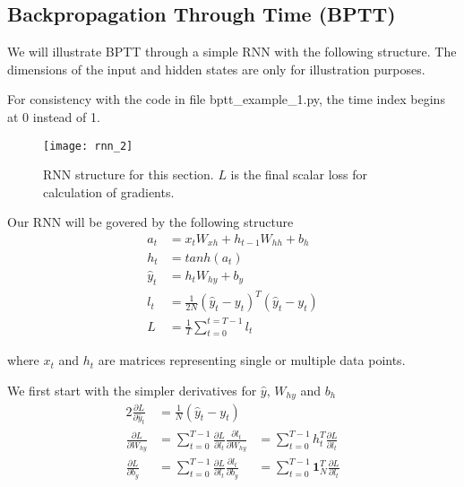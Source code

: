 \documentclass[../../deep_learning_notes.tex]{subfiles}
\begin{document}
\subsection{Backpropagation Through Time (BPTT)}
We will illustrate BPTT through a simple RNN with the following structure. The dimensions of the input and hidden states are only for illustration purposes.\newline

For consistency with the code in file bptt\_example\_1.py, the time index begins at 0 instead of 1.\newline

\begin{figure}[h]
    \texttt{[image: rnn\_2]}
    \centering
    \caption {RNN structure for this section. $L$ is the final scalar loss for calculation of gradients.}
    \label{fig:rnn_2} %
\end{figure}

Our RNN will be govered by the following structure
\begin{align*}
    a_{t} &= x_{t}W_{xh} + h_{t-1}W_{hh} + b_{h}\\
    h_{t} &= tanh(a_{t})\\
    \hat{y}_{t} &= h_{t}W_{hy} + b_{y}\\
    l_{t} &= \frac{1}{2N}(\hat{y}_{t} - y_{t})^{T} (\hat{y}_{t} - y_{t})\\
    L &= \frac{1}{T} \sum_{t=0}^{t=T-1} l_{t} 
\end{align*}

where $x_{t}$ and $h_{t}$ are matrices representing single or multiple data points.\newline

We first start with the simpler derivatives for $\hat{y}$, $W_{hy}$ and $b_{h}$
\begin{alignat*}{2}
    \frac{\partial{L}}{\partial{\hat{y}_{t}}} &= \frac{1}{N}(\hat{y}_{t} - y_{t})\\
    \frac{\partial{L}}{\partial{W_{hy}}} &= \sum_{t=0}^{T-1} \frac{\partial{L}}{\partial{l_{t}}} \frac{\partial{l_{t}}}{\partial{W_{hy}}}
      &= \sum_{t=0}^{T-1} h_{t}^{T} \frac{\partial{L}}{\partial{l_{t}}}\\
    \frac{\partial{L}}{\partial{b_{y}}} &= \sum_{t=0}^{T-1} \frac{\partial{L}}{\partial{l_{t}}} \frac{\partial{l_{t}}}{\partial{b_{y}}}
    &= \sum_{t=0}^{T-1} \mathbf{1}_{N}^{T} \frac{\partial{L}}{\partial{l_{t}}}
\end{alignat*}
\end{document}
